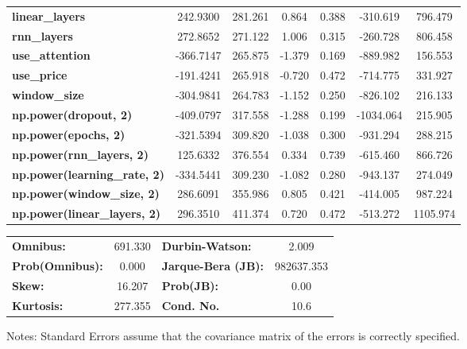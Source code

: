 \begin{center}
\begin{tabular}{lcccccc}
\textbf{linear\_layers}              &     242.9300  &      281.261     &     0.864  &         0.388        &     -310.619    &      796.479     \\
\textbf{rnn\_layers}                 &     272.8652  &      271.122     &     1.006  &         0.315        &     -260.728    &      806.458     \\
\textbf{use\_attention}              &    -366.7147  &      265.875     &    -1.379  &         0.169        &     -889.982    &      156.553     \\
\textbf{use\_price}                  &    -191.4241  &      265.918     &    -0.720  &         0.472        &     -714.775    &      331.927     \\
\textbf{window\_size}                &    -304.9841  &      264.783     &    -1.152  &         0.250        &     -826.102    &      216.133     \\
\textbf{np.power(dropout, 2)}        &    -409.0797  &      317.558     &    -1.288  &         0.199        &    -1034.064    &      215.905     \\
\textbf{np.power(epochs, 2)}         &    -321.5394  &      309.820     &    -1.038  &         0.300        &     -931.294    &      288.215     \\
\textbf{np.power(rnn\_layers, 2)}    &     125.6332  &      376.554     &     0.334  &         0.739        &     -615.460    &      866.726     \\
\textbf{np.power(learning\_rate, 2)} &    -334.5441  &      309.230     &    -1.082  &         0.280        &     -943.137    &      274.049     \\
\textbf{np.power(window\_size, 2)}   &     286.6091  &      355.986     &     0.805  &         0.421        &     -414.005    &      987.224     \\
\textbf{np.power(linear\_layers, 2)} &     296.3510  &      411.374     &     0.720  &         0.472        &     -513.272    &     1105.974     \\
\bottomrule
\end{tabular}
\begin{tabular}{lclc}
\textbf{Omnibus:}       & 691.330 & \textbf{  Durbin-Watson:     } &     2.009   \\
\textbf{Prob(Omnibus):} &   0.000 & \textbf{  Jarque-Bera (JB):  } & 982637.353  \\
\textbf{Skew:}          &  16.207 & \textbf{  Prob(JB):          } &      0.00   \\
\textbf{Kurtosis:}      & 277.355 & \textbf{  Cond. No.          } &      10.6   \\
\bottomrule
\end{tabular}
\end{center}

Notes: \newline
 [1] Standard Errors assume that the covariance matrix of the errors is correctly specified.